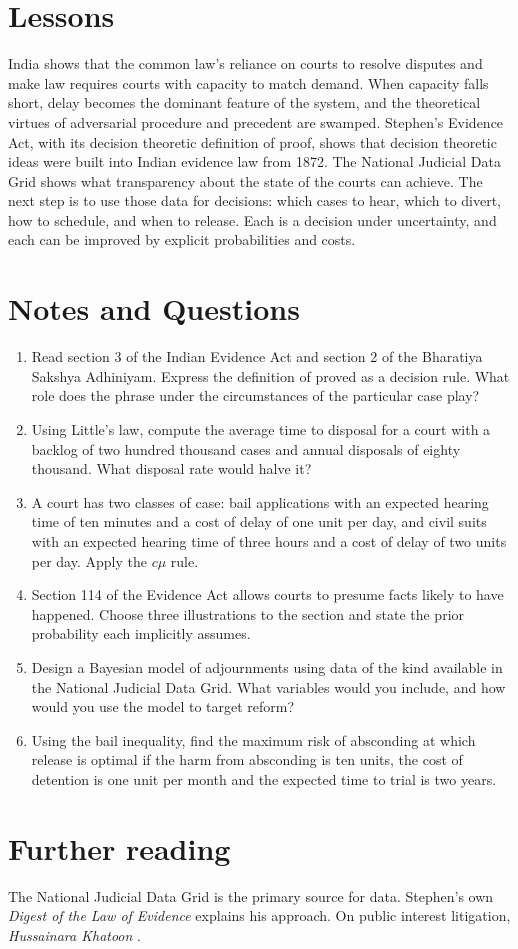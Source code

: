 \section{Lessons}

India shows that the common law's reliance on courts to resolve disputes and make law requires courts with capacity to match demand. When capacity falls short, delay becomes the dominant feature of the system, and the theoretical virtues of adversarial procedure and precedent are swamped. Stephen's Evidence Act, with its decision theoretic definition of proof, shows that decision theoretic ideas were built into Indian evidence law from 1872. The National Judicial Data Grid shows what transparency about the state of the courts can achieve. The next step is to use those data for decisions: which cases to hear, which to divert, how to schedule, and when to release. Each is a decision under uncertainty, and each can be improved by explicit probabilities and costs.

\section*{Notes and Questions}
\begin{enumerate}[label=\arabic*.]
\item Read section 3 of the Indian Evidence Act and section 2 of the Bharatiya Sakshya Adhiniyam. Express the definition of proved as a decision rule. What role does the phrase under the circumstances of the particular case play?
\item Using Little's law, compute the average time to disposal for a court with a backlog of two hundred thousand cases and annual disposals of eighty thousand. What disposal rate would halve it?
\item A court has two classes of case: bail applications with an expected hearing time of ten minutes and a cost of delay of one unit per day, and civil suits with an expected hearing time of three hours and a cost of delay of two units per day. Apply the $c\mu$ rule.
\item Section 114 of the Evidence Act allows courts to presume facts likely to have happened. Choose three illustrations to the section and state the prior probability each implicitly assumes.
\item Design a Bayesian model of adjournments using data of the kind available in the National Judicial Data Grid. What variables would you include, and how would you use the model to target reform?
\item Using the bail inequality, find the maximum risk of absconding at which release is optimal if the harm from absconding is ten units, the cost of detention is one unit per month and the expected time to trial is two years.
\end{enumerate}

\section*{Further reading}
The National Judicial Data Grid is the primary source for data. Stephen's own \emph{Digest of the Law of Evidence} explains his approach. On public interest litigation, \emph{Hussainara Khatoon} \citep{hussainara1979}.
